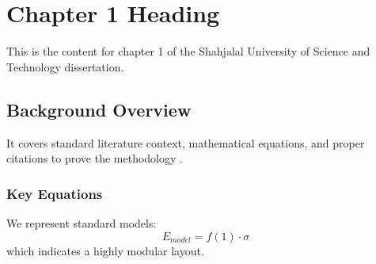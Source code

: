 \chapter{Chapter 1 Heading}
\label{ch:chapter1}
This is the content for chapter 1 of the Shahjalal University of Science and Technology dissertation.

\section{Background Overview}
It covers standard literature context, mathematical equations, and proper citations to prove the methodology \cite{texbook}.

\subsection{Key Equations}
We represent standard models:
\begin{equation}
    E_{model} = f(1) \cdot \sigma
\end{equation}
which indicates a highly modular layout.
